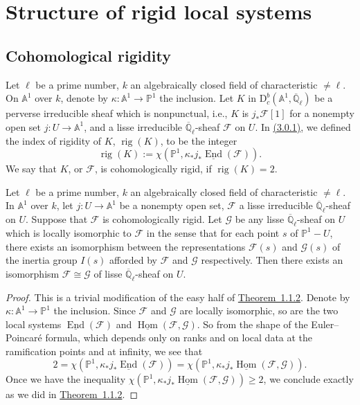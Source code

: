 \chapter{Structure of rigid local systems}
\label{chap:5}
\setcounter{section}{-1}

\section{Cohomological rigidity}\label{sec:5.0}

Let \(\ell\) be a prime number, \(k\) an algebraically closed field of
characteristic \(\neq \ell\). On \(\mathbb{A}^1\) over \(k\), denote by
\(\kappa:\mathbb{A}^1\to \mathbb{P}^1\) the inclusion. Let \(K\) in
\(\mathrm{D}^b_c(\mathbb{A}^1,\overline{\mathbb{Q}}_\ell)\) be a perverse
irreducible sheaf which is nonpunctual, i.e., \(K\) is \(j_*\mathcal{F}[1]\)
for a nonempty open set \(j:U\to\mathbb{A}^1\), and a lisse irreducible
\(\overline{\mathbb{Q}}_\ell\)-sheaf \(\mathcal{F}\) on \(U\). In
\hyperref[par:3.0.1]{(3.0.1)}, we defined the index of rigidity of \(K\),
\(\operatorname{rig}(K)\), to be the integer
\[
  \operatorname{rig}(K):=
  \chi(\mathbb{P}^1,\kappa_*j_*\underline{\operatorname{End}}(\mathcal{F})).
\]
We say that \(K\), or \(\mathcal{F}\), is cohomologically rigid, if
\(\operatorname{rig}(K)=2\).

Let \(\ell\) be a prime number, \(k\) an algebraically closed field of
characteristic \(\neq\ell\). In \(\mathbb{A}^1\) over \(k\), let
\(j:U\to\mathbb{A}^1\) be a nonempty open set, \(\mathcal{F}\) a lisse
irreducible \(\overline{\mathbb{Q}}_\ell\)-sheaf on \(U\). Suppose that
\(\mathcal{F}\) is cohomologically rigid. Let \(\mathcal{G}\) be any lisse
\(\overline{\mathbb{Q}}_\ell\)-sheaf on \(U\) which is locally isomorphic to
\(\mathcal{F}\) in the sense that for each point \(s\) of \(\mathbb{P}^1-U\),
there exists an isomorphism between the representations \(\mathcal{F}(s)\) and
\(\mathcal{G}(s)\) of the inertia group \(I(s)\) afforded by \(\mathcal{F}\)
and \(\mathcal{G}\) respectively. Then there exists an isomorphism
\(\mathcal{F}\cong\mathcal{G}\) of lisse \(\overline{\mathbb{Q}}_\ell\)-sheaf
on \(U\).

\begin{proof}
This is a trivial modification of the easy half of
\hyperref[thm:1.1.2]{Theorem~1.1.2}. Denote by
\(\kappa:\mathbb{A}^1\to\mathbb{P}^1\) the inclusion. Since \(\mathcal{F}\)
and \(\mathcal{G}\) are locally isomorphic, so are the two local systems
\(\underline{\operatorname{End}}(\mathcal{F})\) and
\(\underline{\operatorname{Hom}}(\mathcal{F},\mathcal{G})\). So from the shape
of the Euler--Poincaré formula, which depends only on ranks and on local data
at the ramification points and at infinity, we see that
\[
  2=\chi(\mathbb{P}^1,\kappa_*j_*\underline{\operatorname{End}}(\mathcal{F}))
  =\chi(\mathbb{P}^1,\kappa_*j_*\underline{\operatorname{Hom}}(\mathcal{F},\mathcal{G})).
\]
Once we have the inequality
\(\chi(\mathbb{P}^1,\kappa_*j_*\underline{\operatorname{Hom}}(\mathcal{F},\mathcal{G}))\geq 2\),
we conclude exactly as we did in \hyperref[thm:1.1.2]{Theorem~1.1.2}.
\end{proof}

